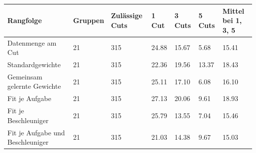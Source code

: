 \begin{tabular}{@{}lllllll@{}}
\toprule
Rangfolge & Gruppen & Zulässige Cuts & 1 Cut & 3 Cuts & 5 Cuts & Mittel bei 1, 3, 5 \\
\midrule
Datenmenge am Cut & 21 & 315 & 24.88 & 15.67 & 5.68 & 15.41 \\
Standardgewichte & 21 & 315 & 22.36 & 19.56 & 13.37 & 18.43 \\
Gemeinsam gelernte Gewichte & 21 & 315 & 25.11 & 17.10 & 6.08 & 16.10 \\
Fit je Aufgabe & 21 & 315 & 27.13 & 20.06 & 9.61 & 18.93 \\
Fit je Beschleuniger & 21 & 315 & 25.79 & 13.55 & 7.04 & 15.46 \\
Fit je Aufgabe und Beschleuniger & 21 & 315 & 21.03 & 14.38 & 9.67 & 15.03 \\
\bottomrule
\end{tabular}
